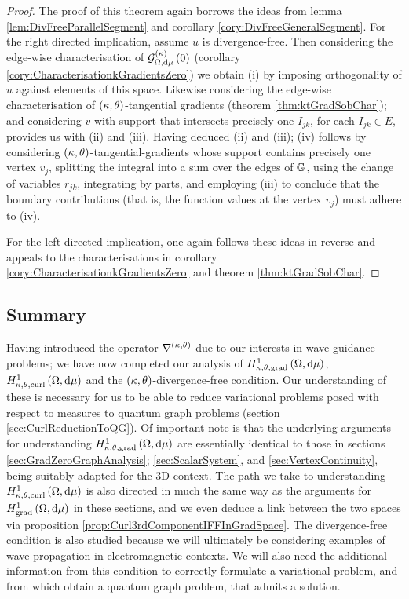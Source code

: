 \begin{proof}
	The proof of this theorem again borrows the ideas from lemma \ref{lem:DivFreeParallelSegment} and corollary \ref{cory:DivFreeGeneralSegment}.
	For the right directed implication, assume $u$ is divergence-free.
	Then considering the edge-wise characterisation of $\mathcal{G}_{ \Omega, \mathrm{d}\mu}^{(\kappa)}\left( 0 \right)$ (corollary \ref{cory:CharacterisationkGradientsZero}) we obtain (i) by imposing orthogonality of $u$ against elements of this space.
	Likewise considering the edge-wise characterisation of $\left( \kappa, \theta \right)$-tangential gradients (theorem \ref{thm:ktGradSobChar}); and considering $v$ with support that intersects precisely one $I_{jk}$, for each $I_{jk}\in E$, provides us with (ii) and (iii).
	Having deduced (ii) and (iii); (iv) follows by considering $\left( \kappa, \theta \right)$-tangential-gradients whose support contains precisely one vertex $v_j$, splitting the integral into a sum over the edges of $\mathbb{G}$, using the change of variables $r_{jk}$, integrating by parts, and employing (iii) to conclude that the boundary contributions (that is, the function values at the vertex $v_j$) must adhere to (iv). \newline
	
	For the left directed implication, one again follows these ideas in reverse and appeals to the characterisations in corollary \ref{cory:CharacterisationkGradientsZero} and theorem \ref{thm:ktGradSobChar}.
\end{proof}

\subsection{Summary}
Having introduced the operator $\nabla^{\left( \kappa, \theta \right)}$ due to our interests in wave-guidance problems; we have now completed our analysis of $H^1_{\kappa,\theta,\mathrm{grad}}\left( \Omega, \mathrm{d}\mu \right)$, $H^1_{\kappa,\theta,\mathrm{curl}}\left( \Omega, \mathrm{d}\mu \right)$ and the $\left( \kappa, \theta \right)$-divergence-free condition.
Our understanding of these is necessary for us to be able to reduce variational problems posed with respect to measures to quantum graph problems (section \ref{sec:CurlReductionToQG}).
Of important note is that the underlying arguments for understanding $H^1_{\kappa,\theta,\mathrm{grad}}\left( \Omega, \mathrm{d}\mu \right)$ are essentially identical to those in sections \ref{sec:GradZeroGraphAnalysis}; \ref{sec:ScalarSystem}, and \ref{sec:VertexContinuity}, being suitably adapted for the 3D context.
The path we take to understanding $H^1_{\kappa,\theta,\mathrm{curl}}\left( \Omega, \mathrm{d}\mu \right)$ is also directed in much the same way as the arguments for $H^1_\mathrm{grad}\left( \Omega, \mathrm{d}\mu \right)$ in these sections, and we even deduce a link between the two spaces via proposition \ref{prop:Curl3rdComponentIFFInGradSpace}.
The divergence-free condition is also studied because we will ultimately be considering examples of wave propagation in electromagnetic contexts.
We will also need the additional information from this condition to correctly formulate a variational problem, and from which obtain a quantum graph problem, that admits a solution.

